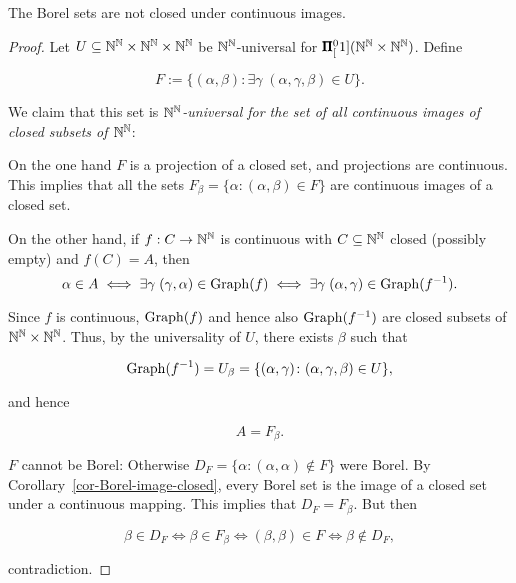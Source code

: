 \begin{theorem}[Souslin]\label{thm-souslin-borel-images}The Borel sets are not closed under continuous images.

\end{theorem}\begin{proof}Let $U \subseteq \mathbb{N}^{\mathbb{N}} \times \mathbb{N}^{\mathbb{N}} \times \mathbb{N}^{\mathbb{N}}$ be $\mathbb{N}^{\mathbb{N}}$-universal for $\pmb{\Pi}^0_{[}1](\mathbb{N}^{\mathbb{N}} \times \mathbb{N}^{\mathbb{N}})$.
Define

\begin{equation*}
F:= \{(\alpha,\beta) \colon \exists \gamma  \; (\alpha,\gamma,\beta) \in U\}.
\end{equation*}

We claim that this set is \textit{$\mathbb{N}^{\mathbb{N}}$-universal for the set of all continuous images of closed subsets of $\mathbb{N}^{\mathbb{N}}$}:

On the one hand $F$ is a projection of a closed set, and projections are continuous. This implies that all the sets $F_\beta = \{ \alpha \colon (\alpha,\beta) \in F \}$ are continuous images of a closed set.

On the other hand, if $f: C \to \mathbb{N}^{\mathbb{N}}$ is continuous with $C \subseteq \mathbb{N}^{\mathbb{N}}$ closed (possibly empty) and $f(C) = A$, then
\begin{equation*}
\alpha \in A \iff \exists \gamma \; (\gamma,\alpha) \in \operatorname{Graph}(f) \iff \exists \gamma \; (\alpha,\gamma) \in  \operatorname{Graph}(f^{-1}).
\end{equation*}

Since $f$ is continuous, $\operatorname{Graph}(f)$ and hence also $\operatorname{Graph}(f^{ -1})$ are closed subsets of $\mathbb{N}^{\mathbb{N}} \times \mathbb{N}^{\mathbb{N}}$. Thus, by the universality of $U$, there exists $\beta$ such that

\begin{equation}
\operatorname{Graph}(f^{-1}) = U_\beta = \{ (\alpha,\gamma) \colon (\alpha,\gamma,\beta) \in U \},
\end{equation}

and hence

\begin{equation}
A = F_\beta.
\end{equation}

$F$ cannot be Borel: Otherwise $D_F = \{\alpha \colon (\alpha,\alpha) \not\in F \}$ were Borel. By Corollary~\ref{cor-Borel-image-closed}, every Borel set is the image of a closed set under a continuous mapping. This implies that $D_F = F_\beta$. But then

\begin{equation}
\beta \in D_F \iff \beta \in F_\beta \iff (\beta,\beta) \in F \iff \beta \not\in D_F,
\end{equation}

contradiction.

\end{proof}